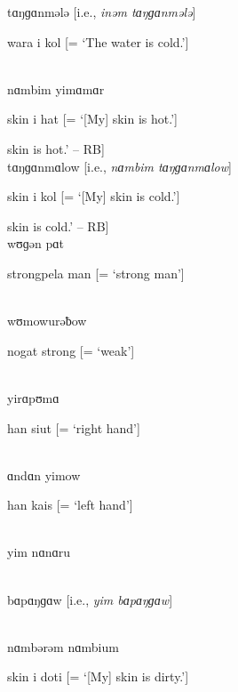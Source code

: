 \noindent {\textasciitilde} tɑŋɡɑnmələ [i.e., \textit{inəm tɑŋɡɑnmələ}]

\noindent wara i kol [= ‘The water is cold.’]

\\

\noindent nɑmbim yimɑmɑr

\noindent skin i hat [= ‘[My] skin is hot.’]

\noindent [‘[My] skin is hot.’ -- RB]\\

\noindent {\textasciitilde} tɑŋɡɑnmɑlow [i.e., \textit{nɑmbim tɑŋɡɑnmɑlow}]

\noindent skin i kol [= ‘[My] skin is cold.’]

\noindent [‘[My] skin is cold.’ -- RB]\\

\noindent wʊɡən pɑt

\noindent strongpela man [= ‘strong man’]

\\

\noindent wʊmowurəƀow

\noindent nogat strong [= ‘weak’]

\noindent [‘weak’ (?) -- RB]\\

\noindent yirɑpʊmɑ

\noindent han siut [= ‘right hand’]

\\

\noindent ɑndɑn yimow

\noindent han kais [= ‘left hand’]

\\

\noindent yim nɑnɑru


\\

\noindent {\textasciitilde} bɑpɑŋɡɑw [i.e., \textit{yim bɑpɑŋɡɑw}]


\\

\noindent nɑmbərəm nɑmbium

\noindent skin i doti [= ‘[My] skin is dirty.’]

